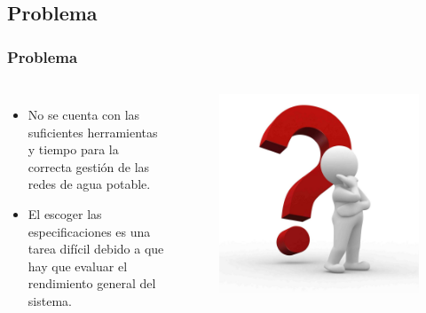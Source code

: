 \documentclass[9pt]{beamer}
\begin{document}
    \subsection{Problema}
    \begin{frame}
        \frametitle{Problema}
        
        \begin{columns}
            \begin{itemize}
                \item No se cuenta con las suficientes herramientas y tiempo para la correcta gestión de las redes de agua potable.
                \item El escoger las especificaciones es una tarea difícil debido a que hay que evaluar el rendimiento general del sistema.
            \end{itemize}

            \begin{figure}
                \includegraphics[width=\textwidth]{assets/MunecosBlancos/Aproblemado.jpg}
            \end{figure}
        \end{columns}
    \end{frame}
\end{document}
